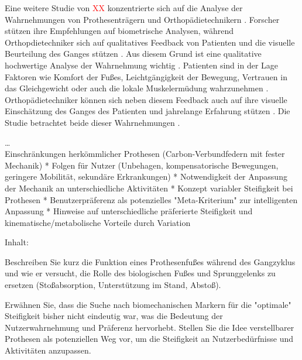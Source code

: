 Eine weitere Studie von \textcolor{red}{XX} konzentrierte sich auf die Analyse der Wahrnehmungen von Prothesenträgern und Orthopädietechnikern \cite{Shepherd.2020}. Forscher stützen ihre Empfehlungen auf biometrische Analysen, während Orthopdietechniker sich auf qualitatives Feedback von Patienten und die visuelle Beurteilung des Ganges stützen \cite{Shepherd.2020}. Aus diesem Grund ist eine qualitative hochwertige Analyse der Wahrnehmung wichtig \cite{Shepherd.2020}. Patienten sind in der Lage Faktoren wie Komfort der Fußes, Leichtgängigkeit der Bewegung, Vertrauen in das Gleichgewicht oder auch die lokale Muskelermüdung wahrzunehmen \cite{Shepherd.2020}. Orthopädietechniker können sich neben diesem Feedback auch auf ihre visuelle Einschätzung des Ganges des Patienten und jahrelange Erfahrung stützen \cite{Shepherd.2020}. Die Studie betrachtet beide dieser Wahrnehmungen \cite{Shepherd.2020}. %


\cite{Clites.2021} %

\cite{Louessard.2022} %

\cite{Vaca.2022} %


\dots \\



Einschränkungen herkömmlicher Prothesen (Carbon-Verbundfedern mit fester Mechanik) *   Folgen für Nutzer (Unbehagen, kompensatorische Bewegungen, geringere Mobilität, sekundäre Erkrankungen) *   Notwendigkeit der Anpassung der Mechanik an unterschiedliche Aktivitäten *   Konzept variabler Steifigkeit bei Prothesen *   Benutzerpräferenz als potenzielles "Meta-Kriterium" zur intelligenten Anpassung *   Hinweise auf unterschiedliche präferierte Steifigkeit und kinematische/metabolische Vorteile durch Variation

Inhalt: 

Beschreiben Sie kurz die Funktion eines Prothesenfußes während des Gangzyklus und wie er versucht, die Rolle des biologischen Fußes und Sprunggelenks zu ersetzen (Stoßabsorption, Unterstützung im Stand, Abstoß). 


Erwähnen Sie, dass die Suche nach biomechanischen Markern für die "optimale" Steifigkeit bisher nicht eindeutig war, was die Bedeutung der Nutzerwahrnehmung und Präferenz hervorhebt. Stellen Sie die Idee verstellbarer Prothesen als potenziellen Weg vor, um die Steifigkeit an Nutzerbedürfnisse und Aktivitäten anzupassen.